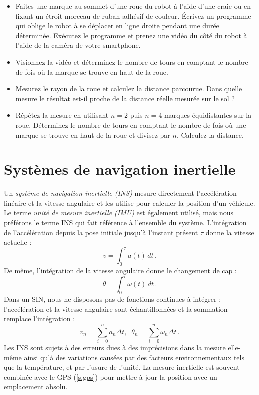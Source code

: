 \begin{framed}
\begin{itemize}
\item Faites une marque au sommet d'une roue du robot à l'aide d'une craie ou en fixant un étroit morceau de ruban adhésif de couleur. Écrivez un programme qui oblige le robot à se déplacer en ligne droite pendant une durée déterminée. Exécutez le programme et prenez une vidéo du côté du robot à l'aide de la caméra de votre smartphone.
\item Visionnez la vidéo et déterminez le nombre de tours en comptant le nombre de fois où la marque se trouve en haut de la roue.
\item Mesurez le rayon de la roue et calculez la distance parcourue. Dans quelle mesure le résultat est-il proche de la distance réelle mesurée sur le sol ?
\item Répétez la mesure en utilisant $n=2$ puis $n=4$ marques équidistantes sur la roue. Déterminez le nombre de tours en comptant le nombre de fois où une marque se trouve en haut de la roue et divisez par $n$. Calculez la distance.
\end{itemize}
\end{framed}

\section{Systèmes de navigation inertielle}\label{s.imu}

Un \emph{système de navigation inertielle (INS)} mesure directement l'accélération linéaire et la vitesse angulaire et les utilise pour calculer la position d'un véhicule. Le terme \emph{unité de mesure inertielle (IMU)} est également utilisé, mais nous préférons le terme INS qui fait référence à l'ensemble du système. L'intégration de l'accélération depuis la pose initiale jusqu'à l'instant présent $\tau$ donne la vitesse actuelle :
\[
v=\int_0^\tau a(t) \,dt\,.
\]
De même, l'intégration de la vitesse angulaire donne le changement de cap :
\[
\theta = \int_0^\tau \omega(t) \, dt\,.
\]
Dans un SIN, nous ne disposons pas de fonctions continues à intégrer ; l'accélération et la vitesse angulaire sont échantillonnées et la sommation remplace l'intégration :
\[
v_n = \sum^{n}_{i=0} a_n \Delta t,\;\; \theta_n = \sum^{n}_{i=0} \omega_n \Delta t\,.
\]
Les INS sont sujets à des erreurs dues à des imprécisions dans la mesure elle-même ainsi qu'à des variations causées par des facteurs environnementaux tels que la température, et par l'usure de l'unité. La mesure inertielle est souvent combinée avec le GPS (\ref{s.gps}) pour mettre à jour la position avec un emplacement absolu.


